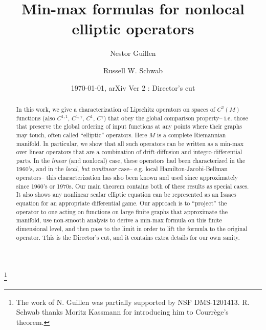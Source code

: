\documentclass[11pt,reqno]{amsart}
\numberwithin{equation}{section}
\theoremstyle{plain}
\def\gam{\gamma}
\begin{document}
\title{Min-max formulas for nonlocal elliptic operators}


\author{Nestor Guillen}
\author{Russell W. Schwab}

\address{Department of Mathematics\\
University of Massachusetts, Amherst\\
Amherst, MA  01003-9305}


\address{Department of Mathematics\\
Michigan State University\\
619 Red Cedar Road \\
East Lansing, MI 48824}

\begin{abstract}
  In this work, we give a characterization of Lipschitz operators on spaces of $C^2(M)$ functions (also $C^{1,1}$, $C^{1,\gam}$, $C^1$, $C^\gam$) that obey the global comparison property-- i.e. those that preserve the global ordering of input functions at any points where their graphs may touch, often called ``elliptic'' operators. Here $M$ is a complete Riemannian manifold. In particular, we show that all such operators can be written as a min-max over linear operators that are a combination of drift-diffusion and integro-differential parts.  In the \emph{linear} (and nonlocal) case, these operators had been characterized in the 1960's, and in the \emph{local, but nonlinear} case-- e.g. local Hamilton-Jacobi-Bellman operators-- this characterization has also been known and used since approximately since 1960's or 1970s.  Our main theorem contains both of these results as special cases. It also shows any nonlinear scalar elliptic equation can be represented as an Isaacs equation for an appropriate differential game. Our approach is to ``project'' the operator to one acting on functions on large finite graphs that approximate the manifold, use non-smooth analysis to derive a min-max formula on this finite dimensional level, and then pass to the limit in order to lift the formula to the original operator.  This is the Director's cut, and it contains extra details for our own sanity.
\end{abstract}

\date{\today, arXiv Ver 2 : Director's cut}
\thanks{The work of N. Guillen was partially supported by NSF DMS-1201413.  R. Schwab thanks Moritz Kassmann for introducing him to Courr\`ege's theorem.}
\end{document}
